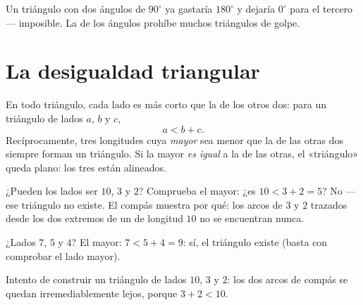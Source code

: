 \begin{example}\label{ex:g7:triangles:tworight}
Un triángulo con dos ángulos de $90^\circ$ ya gastaría
$180^\circ$ y dejaría $0^\circ$ para el tercero --- imposible. La 
de los ángulos prohíbe muchos triángulos de golpe.
\end{example}

\section{La desigualdad triangular}

\begin{theorem}\label{thm:g7:triangles:inequality}
En todo triángulo, cada lado es más corto que la  de los otros
dos: para un triángulo de lados $a$, $b$ y $c$,
\[
a < b + c .
\]
Recíprocamente, tres longitudes cuya \emph{mayor} sea menor que la 
de las otras dos siempre forman un triángulo. Si la mayor
\emph{es igual} a la  de las otras, el «triángulo» queda plano: los
tres  están alineados.
\end{theorem}
\admitted

\begin{example}\label{ex:g7:triangles:inequality}
¿Pueden los lados ser $10$, $3$ y $2$? Comprueba el mayor: ¿es $10 < 3 + 2 = 5$?
No --- ese triángulo no existe. El compás muestra por qué: los arcos de 
$3$ y $2$ trazados desde los dos extremos de un  de longitud $10$ no
se encuentran nunca.

¿Lados $7$, $5$ y $4$? El mayor: $7 < 5 + 4 = 9$: sí, el triángulo
existe (basta con comprobar el lado mayor).
\end{example}

\begin{omfigure}

{\small Intento de construir un triángulo de lados $10$, $3$ y $2$: los dos
arcos de compás se quedan irremediablemente lejos, porque $3 + 2 < 10$.}
\end{omfigure}

